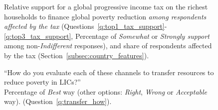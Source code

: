\begin{figure}[h!]
    \caption[Relative support for a global income tax among affected respondents]{Relative support for a global progressive income tax on the richest households to finance global poverty reduction \textit{among respondents affected by the tax} (Questions~\ref{q:top1_tax_support}-\ref{q:top3_tax_support}, Percentage of \textit{Somewhat} or \textit{Strongly support} among non-\textit{Indifferent} responses), and share of respondents affected by the tax (Section~\ref{subsec:country_features}).
    }\label{fig:top_tax_affected_share}
\end{figure}


\begin{figure}[h!]
    \caption[\textit{Best} way to transfer resources to LICs]{``How do you evaluate each of these channels to transfer resources to reduce poverty in LICs?''\\ Percentage of \textit{Best} way (other options: \textit{Right}, \textit{Wrong} or \textit{Acceptable} way). (Question~\ref{q:transfer_how}).
    }\label{fig:transfer_how_above_one}
\end{figure}


